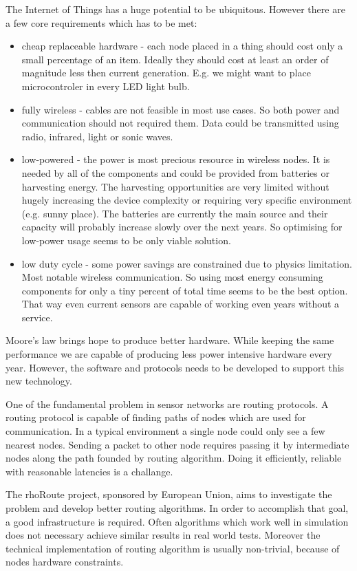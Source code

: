 
The Internet of Things has a huge potential to be ubiquitous. However there are a few core requirements which has to be met:
\begin{itemize}
  \item cheap replaceable hardware - each node placed in a thing should cost only a small percentage of an item. Ideally they should cost at least an order of magnitude less then current generation. E.g. we might want to place microcontroler in every LED light bulb.
  \item fully wireless - cables are not feasible in most use cases. So both power and communication should not required them. Data could be transmitted using radio, infrared, light or sonic waves.
  \item low-powered - the power is most precious resource in wireless nodes. It is needed by all of the components and could be provided from batteries or harvesting energy. The harvesting opportunities are very limited without hugely increasing the device complexity or requiring very specific environment (e.g. sunny place). The batteries are currently the main source and their capacity will probably increase slowly over the next years. So optimising for low-power usage seems to be only viable solution.
  \item low duty cycle - some power savings are constrained due to physics limitation. Most notable wireless communication. So using most energy consuming components for only a tiny percent of total time seems to be the best option. That way even current sensors are capable of working even years without a service.
\end{itemize}

Moore's law brings hope to produce better hardware. While keeping the same performance we are capable of producing less power intensive hardware every year. However, the software and protocols needs to be developed to support this new technology.

One of the fundamental problem in sensor networks are routing protocols. A routing protocol is capable of finding paths of nodes which are used for communication. In a typical environment a single node could only see a few nearest nodes. Sending a packet to other node requires passing it by intermediate nodes along the path founded by routing algorithm. Doing it efficiently, reliable with reasonable latencies is a challange.

The rhoRoute project, sponsored by European Union, aims to investigate the problem and develop better routing algorithms. In order to accomplish that goal, a good infrastructure is required. Often algorithms which work well in simulation does not necessary achieve similar results in real world tests. Moreover the technical implementation of routing algorithm is usually non-trivial, because of nodes hardware constraints.

